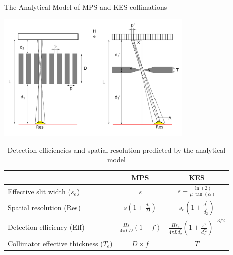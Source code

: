 \documentclass[final]{beamer} %
\begin{document}
\begin{frame}{}
\begin{columns}[t]
\begin{column}{0.49\textwidth}
	  \begin{block}{The Analytical Model of MPS and KES collimations}
			
					\includegraphics[width=0.7\textwidth]{./figures/MPS-KES_scheme}

					
					\begin{table}[h]
					\small
					\centering
					\begin{tabular}{lcc}
						\midrule
																				& MPS                              & KES \\
						\midrule
						Effective slit width ($s_e$)& $s$                              & $s + \frac{\ln(2)}{\mu~\tan(\alpha)}$ \\
						Spatial resolution (Res)		& $s \left(1+\frac{d_1}{D}\right)$ & $s_e \left( 1+\frac{d_1^{'}}{d_2^{'}} \right)$ \\
						Detection efficiency (Eff)	& $\frac{H s}{ 4 \pi L D } (1-f) $ & $\frac{H s_e}{ 4 \pi L d_2^{'} } \left( 1 + \frac{x^2}{d_2^{'2}} \right)^{-3/2} $ \\
						Collimator effective thickness ($T_e$) & $D\times f$           & $T$ \\
						\midrule
					\end{tabular}
					\caption{Detection efficiencies and spatial resolution predicted by the analytical model}
					\end{table}
					
	  \end{block}
		

\end{column}
\end{columns}
\end{frame}
\end{document}
